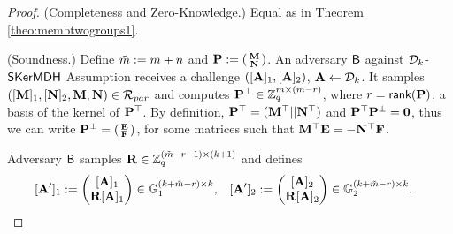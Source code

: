 \begin{proof} (Completeness and Zero-Knowledge.) Equal as in Theorem \ref{theo:membtwogroups1}.

(Soundness.)
Define $\tilde{m}:=m+n$ and $\mathbf{{P}}:=\left(\begin{smallmatrix}\mathbf{{M}}\\\mathbf{{N}}\end{smallmatrix}\right)$. 
An adversary $\mathsf{B}$ against  
$\mathcal{D}_{k}$-$\mathsf{SKerMDH}$ Assumption receives a challenge $([\mathbf{{A}}]_1,[\mathbf{{A}}]_2)$, $\mathbf{{A}} \gets \mathcal{D}_k$. 
It samples 
$([\mathbf{{M}}]_1,[\mathbf{{N}}]_2,\mathbf{{M}},\mathbf{{N}}) \in \mathcal{R}_{par}$ and computes  $\mathbf{{P}}^{\perp} \in \mathbb{Z}_q^{\tilde{m} \times (\tilde{m}-r)}$, where $r=\mathsf{rank}(\mathbf{{P}})$, a basis of the kernel of $\mathbf{{P}}^{\top}$. 
By definition, $\mathbf{{P}}^{\top}=(\mathbf{{M}}^{\top} ||\mathbf{{N}}^{\top})$ and $\mathbf{{P}}^{\top}\mathbf{{P}}^{\perp} =\mathbf{{0}}$, thus we can write $\mathbf{{P}}^{\perp}= \left(\begin{smallmatrix}\mathbf{{E}} \\ \mathbf{{F}}\end{smallmatrix}\right)$, for some matrices such that $\mathbf{{M}}^{\top}\mathbf{{E}}=-\mathbf{{N}}^{\top} \mathbf{{F}}$.

Adversary $\mathsf{B}$ samples 
$\mathbf{{R}} \in \mathbb{Z}_q^{(\tilde{m}-r-1) \times (k+1)}$ and defines 
\begin{align*}
&[\mathbf{{A}}']_1:=\begin{pmatrix} [\mathbf{{A}}]_1 \\ \mathbf{{R}} [\mathbf{{A}}]_1 \end{pmatrix} \in \mathbb{G}_1^{(k+\tilde{m}-r) \times k},&
&[\mathbf{{A}}']_2:=\begin{pmatrix} [\mathbf{{A}}]_2 \\ \mathbf{{R}} [\mathbf{{A}}]_2 \end{pmatrix} \in \mathbb{G}_2^{(k+\tilde{m}-r) \times k}.
\end{align*} 


\end{proof}

